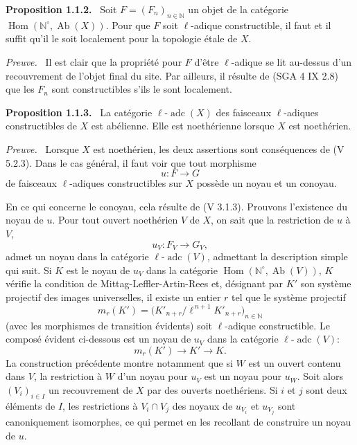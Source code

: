 \documentclass[11pt]{article}
\newenvironment{statement}[1]{\par\medskip\noindent\textbf{#1.}\ }{\par\medskip}
\newenvironment{prooftext}[1][Proof]{\par\noindent\emph{#1.}\ }{\par\medskip}
\DeclareMathOperator{\Hom}{Hom}
\providecommand{\Hom}{\operatorname{Hom}}
\providecommand{\Ab}{\operatorname{Ab}}
\providecommand{\adc}{\operatorname{adc}}
\begin{document}
\begin{statement}{Proposition 1.1.2}
Soit \(F=(F_n)_{n\in\mathbb N}\) un objet de la catégorie \(\Hom(\mathbb N^\circ,\Ab(X))\). Pour que \(F\) soit \(\ell\)-adique constructible, il faut et il suffit qu'il le soit localement pour la topologie étale de \(X\).
\end{statement}

\begin{prooftext}[Preuve]
Il est clair que la propriété pour \(F\) d'être \(\ell\)-adique se lit au-dessus d'un recouvrement de l'objet final du site. Par ailleurs, il résulte de (SGA 4 IX 2.8) que les \(F_n\) sont constructibles s'ils le sont localement.
\end{prooftext}

\begin{statement}{Proposition 1.1.3}
La catégorie \(\ell\text{-}\adc(X)\) des faisceaux \(\ell\)-adiques constructibles de \(X\) est abélienne. Elle est noethérienne lorsque \(X\) est noethérien.
\end{statement}

\begin{prooftext}[Preuve]
Lorsque \(X\) est noethérien, les deux assertions sont conséquences de (V 5.2.3). Dans le cas général, il faut voir que tout morphisme
\[
u:F\longrightarrow G
\]
de faisceaux \(\ell\)-adiques constructibles sur \(X\) possède un noyau et un conoyau.

En ce qui concerne le conoyau, cela résulte de (V 3.1.3). Prouvons l'existence du noyau de \(u\). Pour tout ouvert noethérien \(V\) de \(X\), on sait que la restriction de \(u\) à \(V\),
\[
u_V:F_V\longrightarrow G_V,
\]
admet un noyau dans la catégorie \(\ell\text{-}\adc(V)\), admettant la description simple qui suit. Si \(K\) est le noyau de \(u_V\) dans la catégorie \(\Hom(\mathbb N^\circ,\Ab(V))\), \(K\) vérifie la condition de Mittag-Leffler-Artin-Rees et, désignant par \(K'\) son système projectif des images universelles, il existe un entier \(r\) tel que le système projectif
\[
m_r(K')=\bigl(K'_{n+r}/\ell^{\,n+1}K'_{n+r}\bigr)_{n\in\mathbb N}
\]
(avec les morphismes de transition évidents) soit \(\ell\)-adique constructible. Le composé évident ci-dessous est un noyau de \(u_V\) dans la catégorie \(\ell\text{-}\adc(V)\):
\[
m_r(K')\longrightarrow K'\longrightarrow K.
\]
La construction précédente montre notamment que si \(W\) est un ouvert contenu dans \(V\), la restriction à \(W\) d'un noyau pour \(u_V\) est un noyau pour \(u_W\). Soit alors \((V_i)_{i\in I}\) un recouvrement de \(X\) par des ouverts noethériens. Si \(i\) et \(j\) sont deux éléments de \(I\), les restrictions à \(V_i\cap V_j\) des noyaux de \(u_{V_i}\) et \(u_{V_j}\) sont canoniquement isomorphes, ce qui permet en les recollant de construire un noyau de \(u\).
\end{prooftext}
\end{document}
